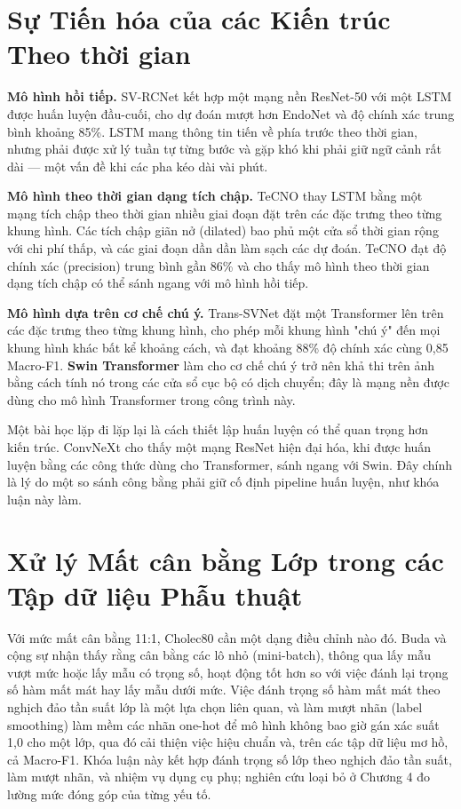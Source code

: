 \documentclass[11pt,a4paper]{report}
\begin{document}
\section{Sự Tiến hóa của các Kiến trúc Theo thời gian}

\textbf{Mô hình hồi tiếp.} SV-RCNet kết hợp một mạng nền ResNet-50 với một LSTM được huấn luyện đầu-cuối, cho dự đoán mượt hơn EndoNet và độ chính xác trung bình khoảng 85\%. LSTM mang thông tin tiến về phía trước theo thời gian, nhưng phải được xử lý tuần tự từng bước và gặp khó khi phải giữ ngữ cảnh rất dài --- một vấn đề khi các pha kéo dài vài phút.

\textbf{Mô hình theo thời gian dạng tích chập.} TeCNO thay LSTM bằng một mạng tích chập theo thời gian nhiều giai đoạn đặt trên các đặc trưng theo từng khung hình. Các tích chập giãn nở (dilated) bao phủ một cửa sổ thời gian rộng với chi phí thấp, và các giai đoạn dần dần làm sạch các dự đoán. TeCNO đạt độ chính xác (precision) trung bình gần 86\% và cho thấy mô hình theo thời gian dạng tích chập có thể sánh ngang với mô hình hồi tiếp.

\textbf{Mô hình dựa trên cơ chế chú ý.} Trans-SVNet đặt một Transformer lên trên các đặc trưng theo từng khung hình, cho phép mỗi khung hình "chú ý" đến mọi khung hình khác bất kể khoảng cách, và đạt khoảng 88\% độ chính xác cùng 0,85 Macro-F1. \textbf{Swin Transformer} làm cho cơ chế chú ý trở nên khả thi trên ảnh bằng cách tính nó trong các cửa sổ cục bộ có dịch chuyển; đây là mạng nền được dùng cho mô hình Transformer trong công trình này.

Một bài học lặp đi lặp lại là cách thiết lập huấn luyện có thể quan trọng hơn kiến trúc. ConvNeXt cho thấy một mạng ResNet hiện đại hóa, khi được huấn luyện bằng các công thức dùng cho Transformer, sánh ngang với Swin. Đây chính là lý do một so sánh công bằng phải giữ cố định pipeline huấn luyện, như khóa luận này làm.

\section{Xử lý Mất cân bằng Lớp trong các Tập dữ liệu Phẫu thuật}

Với mức mất cân bằng 11:1, Cholec80 cần một dạng điều chỉnh nào đó. Buda và cộng sự nhận thấy rằng cân bằng các lô nhỏ (mini-batch), thông qua lấy mẫu vượt mức hoặc lấy mẫu có trọng số, hoạt động tốt hơn so với việc đánh lại trọng số hàm mất mát hay lấy mẫu dưới mức. Việc đánh trọng số hàm mất mát theo nghịch đảo tần suất lớp là một lựa chọn liên quan, và làm mượt nhãn (label smoothing) làm mềm các nhãn one-hot để mô hình không bao giờ gán xác suất 1,0 cho một lớp, qua đó cải thiện việc hiệu chuẩn và, trên các tập dữ liệu mơ hồ, cả Macro-F1. Khóa luận này kết hợp đánh trọng số lớp theo nghịch đảo tần suất, làm mượt nhãn, và nhiệm vụ dụng cụ phụ; nghiên cứu loại bỏ ở Chương 4 đo lường mức đóng góp của từng yếu tố.
\end{document}

